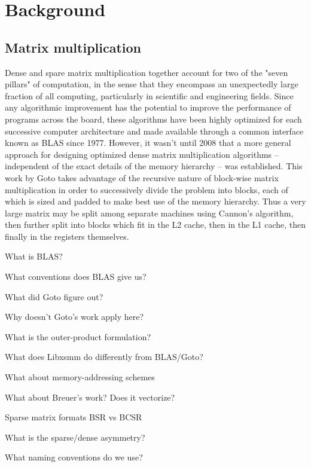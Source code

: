 \chapter{Background}
\label{chapter:review}

\section{Matrix multiplication}

Dense and spare matrix multiplication together account for two of the "seven pillars" of computation, in the sense that they encompass an unexpectedly large fraction of all computing, particularly in scientific and engineering fields. Since any algorithmic improvement has the potential to improve the performance of programs across the board, these algorithms have been highly optimized for each successive computer architecture and made available through a common interface known as BLAS since 1977. However, it wasn't until 2008 that a more general approach for designing optimized dense matrix multiplication algorithms -- independent of the exact details of the memory hierarchy -- was established. This work by Goto takes advantage of the recursive nature of block-wise matrix multiplication in order to successively divide the problem into blocks, each of which is sized and padded to make best use of the memory hierarchy. Thus a very large matrix may be split among separate machines using Cannon's algorithm, then further split into blocks which fit in the L2 cache, then in the L1 cache, then finally in the registers themselves. 



What is BLAS?

What conventions does BLAS give us?

What did Goto figure out?

Why doesn't Goto's work apply here?

What is the outer-product formulation?

What does Libxsmm do differently from BLAS/Goto?

What about memory-addressing schemes

What about Breuer's work? Does it vectorize?

Sparse matrix formats BSR vs BCSR

What is the sparse/dense asymmetry?

What naming conventions do we use?




